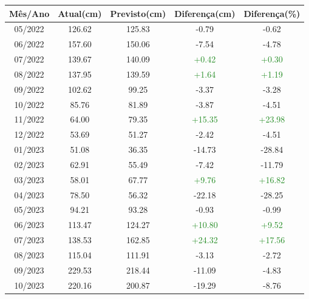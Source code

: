 \begin{table}[H]
\centering
\begin{tabular}{|c|c|c|c|c|}
	\hline
	\textbf{Mês/Ano} &  \textbf{Atual(cm)} &  \textbf{Previsto(cm)} &  \textbf{Diferença(cm)} &  \textbf{Diferença(\%)} \\
	\hline
	05/2022 & 126.62 & 125.83 & \textcolor{BrickRed}{-0.79} & \textcolor{BrickRed}{-0.62} \\
06/2022 & 157.60 & 150.06 & \textcolor{BrickRed}{-7.54} & \textcolor{BrickRed}{-4.78} \\
07/2022 & 139.67 & 140.09 & \textcolor{ForestGreen}{+0.42} & \textcolor{ForestGreen}{+0.30} \\
08/2022 & 137.95 & 139.59 & \textcolor{ForestGreen}{+1.64} & \textcolor{ForestGreen}{+1.19} \\
09/2022 & 102.62 & 99.25 & \textcolor{BrickRed}{-3.37} & \textcolor{BrickRed}{-3.28} \\
10/2022 & 85.76 & 81.89 & \textcolor{BrickRed}{-3.87} & \textcolor{BrickRed}{-4.51} \\
11/2022 & 64.00 & 79.35 & \textcolor{ForestGreen}{+15.35} & \textcolor{ForestGreen}{+23.98} \\
12/2022 & 53.69 & 51.27 & \textcolor{BrickRed}{-2.42} & \textcolor{BrickRed}{-4.51} \\
01/2023 & 51.08 & 36.35 & \textcolor{BrickRed}{-14.73} & \textcolor{BrickRed}{-28.84} \\
02/2023 & 62.91 & 55.49 & \textcolor{BrickRed}{-7.42} & \textcolor{BrickRed}{-11.79} \\
03/2023 & 58.01 & 67.77 & \textcolor{ForestGreen}{+9.76} & \textcolor{ForestGreen}{+16.82} \\
04/2023 & 78.50 & 56.32 & \textcolor{BrickRed}{-22.18} & \textcolor{BrickRed}{-28.25} \\
05/2023 & 94.21 & 93.28 & \textcolor{BrickRed}{-0.93} & \textcolor{BrickRed}{-0.99} \\
06/2023 & 113.47 & 124.27 & \textcolor{ForestGreen}{+10.80} & \textcolor{ForestGreen}{+9.52} \\
07/2023 & 138.53 & 162.85 & \textcolor{ForestGreen}{+24.32} & \textcolor{ForestGreen}{+17.56} \\
08/2023 & 115.04 & 111.91 & \textcolor{BrickRed}{-3.13} & \textcolor{BrickRed}{-2.72} \\
09/2023 & 229.53 & 218.44 & \textcolor{BrickRed}{-11.09} & \textcolor{BrickRed}{-4.83} \\
10/2023 & 220.16 & 200.87 & \textcolor{BrickRed}{-19.29} & \textcolor{BrickRed}{-8.76} \\

\end{tabular}
\end{table}
